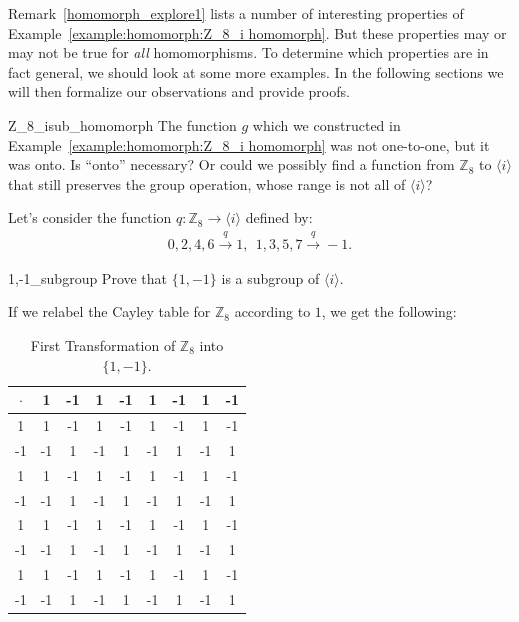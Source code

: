 Remark~\ref{homomorph_explore1} lists a number of interesting properties of Example~\ref{example:homomorph:Z_8_i homomorph}. 
But these properties may or may not be true for \emph{all} homomorphisms.  To determine which properties are in fact general, we should look at some more examples.   In the following sections we will then formalize our observations and provide proofs.

\begin{example}{Z_8_isub_homomorph}
The function $g$ which we constructed in Example~\ref{example:homomorph:Z_8_i homomorph} was not one-to-one, but it was onto. Is ``onto'' necessary? Or could we possibly find a function from ${\mathbb Z}_8$ to $\langle i \rangle$ that still preserves the group operation, whose range is not all of $\langle i \rangle$?  


Let's consider the function $q: {\mathbb Z}_8 \longrightarrow \langle i \rangle$  defined by: 
\begin{align*}
    0,2,4,6\overset{q}{\longrightarrow} 1 ,~~     1,3,5,7 \overset{q}{\longrightarrow} -1.
\end{align*}

\begin{exercise}{1,-1_subgroup}
Prove that $\{1,-1\}$ is a subgroup of $\langle i \rangle$.
\end{exercise}

If we relabel the Cayley table for ${\mathbb Z}_8$ according to $1$, we get the following:

\begin{table}[H]
\caption{\label{1,-1_Z8_transfom1}First Transformation of ${\mathbb Z}_8$ into $\{1,-1\}$.}{\small
\begin{center}
\begin{tabular}{c|cccccccc}
$\cdot$ & 1 &-1 & 1 & -1 & 1 & -1 & 1 & -1 \\
\hline
1         & 1 &-1 & 1 & -1 & 1 & -1 & 1 & -1 \\
-1      &-1 & 1 & -1 & 1 & -1 & 1 & -1 & 1  \\
1       & 1 &-1 & 1 & -1 & 1 & -1 & 1 & -1 \\
-1       &-1 & 1 & -1 & 1 & -1 & 1 & -1 & 1  \\
1        & 1 &-1 & 1 & -1 & 1 & -1 & 1 & -1 \\
-1        &-1 & 1 & -1 & 1 & -1 & 1 & -1 & 1  \\
1      & 1 &-1 & 1 & -1 & 1 & -1 & 1 & -1 \\
-1      &-1 & 1 & -1 & 1 & -1 & 1 & -1 & 1  \\
\end{tabular}
\end{center}
}
\end{table}


\end{example}
